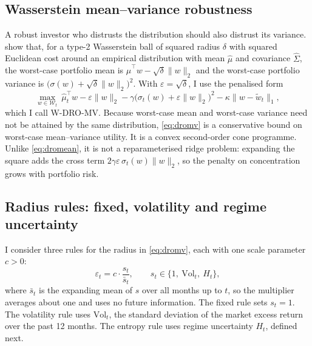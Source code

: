 \documentclass[11pt]{article}
\begin{document}
\subsection{Wasserstein mean--variance robustness}
A robust investor who distrusts the distribution should also distrust its variance. \citet{blanchet2022} show that, for a type-2 Wasserstein ball of squared radius $\delta$ with squared Euclidean cost around an empirical distribution with mean $\hat\mu$ and covariance $\hat\Sigma$, the worst-case portfolio mean is $\hat\mu^\top w-\sqrt\delta\lVert w\rVert_2$ and the worst-case portfolio variance is $\big(\sigma(w)+\sqrt\delta\lVert w\rVert_2\big)^2$. With $\varepsilon=\sqrt\delta$, I use the penalised form
\begin{equation}\label{eq:dromv}
\max_{w\in\mathcal{W}_t}\ \hat\mu_t^\top w-\varepsilon\lVert w\rVert_2-\gamma\big(\sigma_t(w)+\varepsilon\lVert w\rVert_2\big)^2-\kappa\lVert w-\tilde w_t\rVert_1 ,
\end{equation}
which I call W-DRO-MV. Because worst-case mean and worst-case variance need not be attained by the same distribution, \eqref{eq:dromv} is a conservative bound on worst-case mean--variance utility. It is a convex second-order cone programme. Unlike \eqref{eq:dromean}, it is not a reparameterised ridge problem: expanding the square adds the cross term $2\gamma\varepsilon\,\sigma_t(w)\lVert w\rVert_2$, so the penalty on concentration grows with portfolio risk.

\subsection{Radius rules: fixed, volatility and regime uncertainty}
I consider three rules for the radius in \eqref{eq:dromv}, each with one scale parameter $c>0$:
\begin{equation}\label{eq:radius}
\varepsilon_t=c\cdot\frac{s_t}{\bar s_t},\qquad s_t\in\{1,\ \mathrm{Vol}_t,\ H_t\},
\end{equation}
where $\bar s_t$ is the expanding mean of $s$ over all months up to $t$, so the multiplier averages about one and uses no future information. The fixed rule sets $s_t=1$. The volatility rule uses $\mathrm{Vol}_t$, the standard deviation of the market excess return over the past 12 months. The entropy rule uses regime uncertainty $H_t$, defined next.
\end{document}

